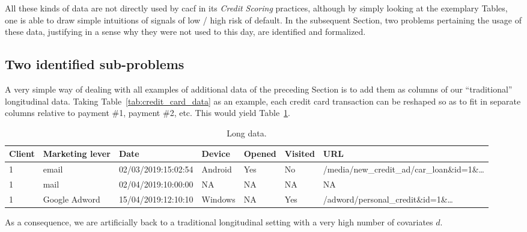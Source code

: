 All these kinds of data are not directly used by \gls{cacf} in its \textit{Credit Scoring} practices, although by simply looking at the exemplary Tables, one is able to draw simple intuitions of signals of low / high risk of default. In the subsequent Section, two problems pertaining the usage of these data, justifying in a sense why they were not used to this day, are identified and formalized.


\subsection{Two identified sub-problems}

A very simple way of dealing with all examples of additional data of the preceding Section is to add them as columns of our ``traditional'' longitudinal data. Taking Table~\ref{tab:credit_card_data} as an example, each credit card transaction can be reshaped so as to fit in separate columns relative to payment \#1, payment \#2, etc. This would yield Table~\ref{tab:example_longitudinal}.


\begin{table}[ht]
    \centering
    \caption{Long data.}
    \label{tab:example_longitudinal}
    \begin{tiny}
\begin{tabular}{lllllll}
Client & Marketing lever & Date & Device & Opened & Visited & URL \\
 \hline
1 & email & 02/03/2019:15:02:54 & Android & Yes & No & /media/new\_credit\_ad/car\_loan\&id=1\&\dots \\
1 & mail & 02/04/2019:10:00:00 & NA & NA & NA & NA \\
1 & Google Adword & 15/04/2019:12:10:10 & Windows & NA & Yes & /adword/personal\_credit\&id=1\&\dots \\
\end{tabular}
    \end{tiny}
\end{table}

As a consequence, we are artificially back to a traditional longitudinal setting with a very high number of covariates $d$.

%



